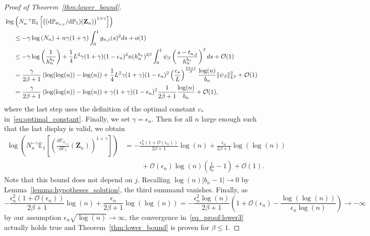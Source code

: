 \documentclass[10.5pt,letter]{article}
\numberwithin{equation}{section}
\theoremstyle{definition}
\newcommand{\E}{\mathbb{E}}
\renewcommand{\P}{\mathbb{P}}
\newcommand{\1}{\mathbbm{1}}
\begin{document}
\begin{proof}[Proof of Theorem~\ref{thm:lower_bound}]
\begin{align*}
    &\log\left( N_n^{-\gamma}\E_1 \left[\left((\textrm{d}\P_{\sigma_{n,j}}/\textrm{d}\P_1)(\mathbf{Z}_n)\right)^{1+\gamma}\right] \right)\\
    &\hspace{0.5cm} \leq -\gamma \log\left( N_n\right) + n \gamma (1+\gamma) \int_0^1 g_{n,j}(s)^2 ds + o(1) \\
    &\hspace{0.5cm} \leq -\gamma\log\left(\frac{1}{h_n^{b_n}}\right) + \frac14 L^2 \gamma(1+\gamma)(1-\epsilon_n)^2 n(h_n^{b_n})^{2\beta} \int_0^1 \psi_\beta\left( \frac{s-t_{n,j}}{h_n^{b_n}}\right)^2 ds + \mathcal{O}(1)\\
    &\hspace{0.5cm} =\frac{\gamma}{2\beta+1}\left( \log(\log(n)) - \log(n)\right) + \frac14 L^2 \gamma(1+\gamma)(1-\epsilon_n)^2 \left(\frac{c_*}{L}\right)^{\frac{2\beta+1}{\beta}} \frac{\log(n)}{b_n} \|\psi_\beta\|_{L^2}^2 +\mathcal{O}(1) \\
    &\hspace{0.5cm} = \frac{\gamma}{2\beta+1}\left( \log(\log(n)) - \log(n)\right) + \gamma(1+\gamma)(1-\epsilon_n)^2 \frac{1}{2\beta+1} \frac{\log(n)}{b_n} + \mathcal{O}(1),
\end{align*}
where the last step uses the definition of the optimal constant $c_*$ in~\eqref{eq:optimal_constant}. Finally, we set $\gamma=\epsilon_n$. Then for all $n$ large enough such that the last display is valid, we obtain \pagebreak
\begin{align*}
    \log\left( N_n^{-\gamma}\E_1 \left[\left(\frac{\textrm{d}\P_{\sigma_{n,j}}}{\textrm{d}\P_1}(\mathbf{Z}_n)\right)^{1+\gamma}\right] \right) &= - \frac{\epsilon_n^2\left( 1+ \mathcal{O}(\epsilon_n)\right)}{2\beta+1}\log(n) + \frac{\epsilon_n}{2\beta+1}\log(\log(n))\\
    &\hspace{1cm} + \mathcal{O}(\epsilon_n)\log(n)\left(\frac{1}{b_n}-1\right) + \mathcal{O}(1).
\end{align*}
Note that this bound does not depend on $j$. Recalling $\log(n)|b_n-1|\rightarrow 0$ by Lemma~\ref{lemma:hypotheses_solution}, the third summand vanishes. Finally, as
\[ -\frac{\epsilon_n^2(1+\mathcal{O}(\epsilon_n))}{2\beta+1}\log(n) + \frac{\epsilon_n}{2\beta+1}\log(\log(n)) = -\frac{\epsilon_n^2\log(n)}{2\beta+1} \left( 1 +\mathcal{O}(\epsilon_n) - \frac{\log(\log(n))}{\epsilon_n\log(n)}\right) \rightarrow -\infty\]
by our assumption $\epsilon_n\sqrt{\log(n)}\rightarrow\infty$, the convergence in~\eqref{eq_proof:lower3} actually holds true and Theorem~\ref{thm:lower_bound} is proven for $\beta\leq 1$.\smallskip






\end{proof}
\end{document}
